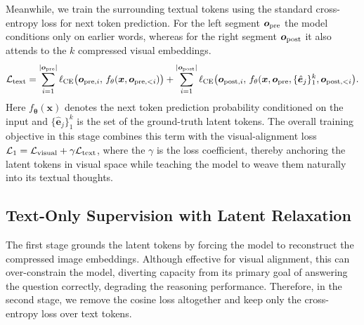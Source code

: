 Meanwhile, we train the surrounding textual tokens using the standard cross-entropy loss for next token prediction. For the left segment $\bm o_{\rm pre}$ the model conditions only on earlier words, whereas for the right segment $\bm o_{\rm post}$ it also attends to the $k$ compressed visual embeddings.
\begin{equation}
    \begin{aligned}
        \mathcal{L}_{\rm text} = 
        \sum_{i=1}^{|\bm o_{\rm pre}|}\ell_{\rm CE}\bigl(\bm o_{\mathrm{pre}, i},\,f_{\theta}(\bm x, \bm o_{\mathrm{pre}, <i})\bigr)
        + \sum_{i=1}^{|\bm o_{\mathrm{post}}|}\ell_{\rm CE}\bigl(\bm o_{\mathrm{post}, i},\,f_{\theta}(\bm x, \bm o_{\mathrm{pre}}, \{\hat{\bm e}_{j}\}_{1}^{k},\bm o_{\mathrm{post}, <i}\bigr).
    \end{aligned}
\end{equation}
Here $f_{\bm \theta}(\bm x)$ denotes the next token prediction probability conditioned on the input and $\{\hat{\bm e}_{j}\}_{1}^{k}$ is the set of the ground-truth latent tokens.
The overall training objective in this stage combines this term with the visual-alignment loss $\mathcal{L}_{1}=\mathcal{L}_{\rm visual}+\gamma \mathcal{L}_{\rm text}$, where the $\gamma$ is the loss coefficient, thereby anchoring the latent tokens in visual space while teaching the model to weave them naturally into its textual thoughts.


\subsection{Text-Only Supervision with Latent Relaxation}
\label{sec:method-stage2}

The first stage grounds the latent tokens by forcing the model to reconstruct the compressed image embeddings. Although effective for visual alignment, this can over-constrain the model, diverting capacity from its primary goal of answering the question correctly, degrading the reasoning performance. Therefore, in the second stage, we remove the cosine loss altogether and keep only the cross-entropy loss over text tokens. 


